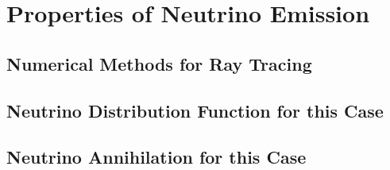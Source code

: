 \chapter{Properties of Neutrino Emission}
\label{chap:ray_tracing}

\section{Numerical Methods for Ray Tracing}

\section{Neutrino Distribution Function for this Case}

\section{Neutrino Annihilation for this Case}

